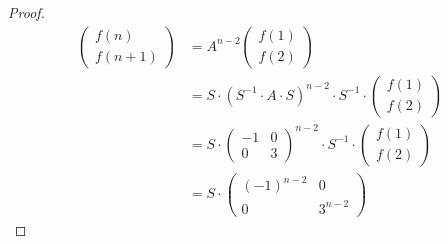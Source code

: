\documentclass{article}
\begin{document}
\begin{enumerate}[(a)]
\begin{proof}
	\begin{align*} 
 \left(\begin{matrix} f(n) \\ f(n+1) \end{matrix}\right) &= A^{n-2} \left(\begin{matrix} f(1) \\ f(2) \end{matrix}\right)  \\
			&= S \cdot (S^{-1} \cdot A \cdot S)^{n-2} \cdot S^{-1} \cdot \left(\begin{matrix} f(1) \\ f(2) \end{matrix}\right) \\
			&= S \cdot \left(\begin{matrix} -1 & 0 \\ 0 & 3 \end{matrix}\right)^{n-2} \cdot S^{-1} \cdot \left(\begin{matrix} f(1) \\ f(2) \end{matrix}\right) \\
			&= S \cdot \left(\begin{matrix} (-1)^{n-2} & 0 \\ 0 & 3^{n-2} \end{matrix}\right)
	\end{align*}
\end{proof}
		    	 \end{enumerate}
\end{document}
